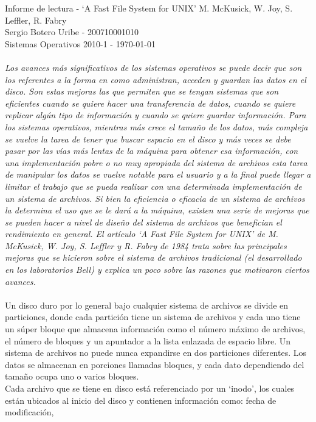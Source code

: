 \documentclass[]{article}
\begin{document}
{\Large
Informe de lectura - `A Fast File System for UNIX' {\tiny M. McKusick, W. Joy, S. Leffler, R. Fabry}\\
Sergio Botero Uribe - 200710001010\\
Sistemas Operativos 2010-1 -  \today  \\ \\ 
}
{
\em
Los avances más significativos de los sistemas operativos se puede decir que son los referentes a la forma en como administran, acceden y guardan las datos en el
disco. Son estas mejoras las que permiten que se tengan sistemas que son eficientes cuando se quiere hacer una transferencia de datos, cuando se quiere replicar
algún tipo de información y cuando se quiere guardar información.
Para los sistemas operativos, mientras más crece el tamaño de los datos, más compleja se vuelve la tarea de tener que buscar espacio en el disco y más veces se debe
 pasar por las vías más lentas de la máquina para obtener esa información, con una implementación pobre o no muy apropiada del sistema de archivos esta tarea
de manipular los datos se vuelve notable para el usuario y a la final puede llegar a limitar el trabajo que se pueda realizar con una determinada implementación de un
sistema de archivos.
Si bien la eficiencia o eficacia de un sistema de archivos la determina el uso que se le dará a la máquina, existen una serie de mejoras que se pueden hacer a nivel de
diseño del sistema de archivos que benefician el rendimiento en general.
El artículo `A Fast File System for UNIX' de M. McKusick, W. Joy, S. Leffler y R. Fabry de 1984 trata sobre las principales mejoras que se hicieron sobre el sistema de archivos
tradicional (el desarrollado en los laboratorios Bell) y explica un poco sobre las razones que motivaron ciertos avances.\\ \\
}
Un disco duro por lo general bajo cualquier sistema de archivos se divide en particiones, donde cada partición tiene un sistema de archivos y cada uno tiene un
súper bloque que almacena información como el número máximo de archivos, el número de bloques y un apuntador a la lista enlazada de espacio libre. Un
sistema de archivos no puede nunca expandirse en dos particiones diferentes. Los datos se almacenan en porciones llamadas bloques, y cada dato dependiendo
del tamaño ocupa uno o varios bloques.\\
Cada archivo que se tiene en disco está referenciado por un `inodo’, los cuales están ubicados al inicio del disco y contienen información como: fecha de modificación,
\end{document}
